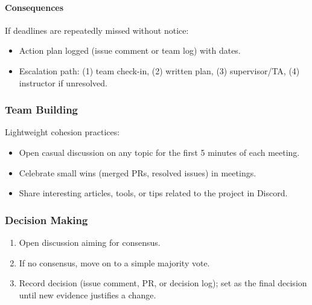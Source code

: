 \documentclass{article}
\begin{document}
\paragraph{Consequences}
If deadlines are repeatedly missed without notice:
\begin{itemize}
  \item Action plan logged (issue comment or team log) with dates.
  \item Escalation path: (1) team check-in, (2) written plan, (3) supervisor/TA, (4) instructor if unresolved.
\end{itemize}

\subsubsection*{Team Building}
Lightweight cohesion practices:
\begin{itemize}
  \item Open casual discussion on any topic for the first 5 minutes of each meeting.
  \item Celebrate small wins (merged PRs, resolved issues) in meetings.
  \item Share interesting articles, tools, or tips related to the project in Discord.
\end{itemize}


\subsubsection*{Decision Making}
\begin{enumerate}
  \item Open discussion aiming for consensus.
  \item If no consensus, move on to a simple majority vote.
  \item Record decision (issue comment, PR, or decision log); set as the final decision until new evidence justifies a change.
\end{enumerate}
\end{document}

